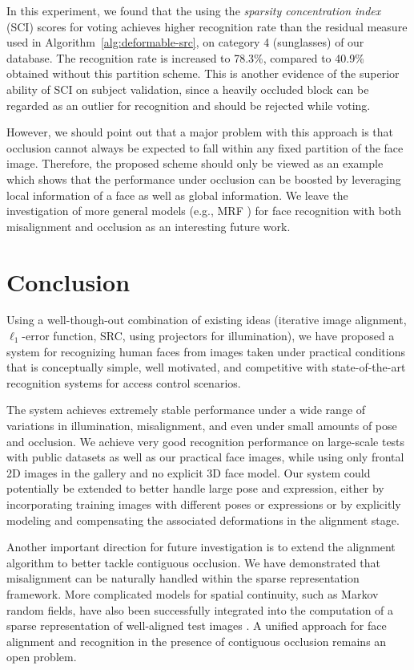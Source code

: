 \documentclass[10pt,journal,letterpaper,compsoc]{IEEEtran} %
\begin{document}
In this experiment, we found that the using the \emph{sparsity
concentration index} (SCI) scores for voting achieves higher
recognition rate than the residual measure used in Algorithm~\ref{alg:deformable-src}, on
category 4 (sunglasses) of our database. The recognition rate
is increased to 78.3\%, compared to 40.9\% obtained without
this partition scheme. This is another evidence of the superior
ability of SCI on subject validation, since a heavily occluded
block can be regarded as an outlier for recognition and should
be rejected while voting.

However, we should point out that a major problem with this
approach is that occlusion cannot always be expected to fall within
 any fixed partition of the face image. Therefore, the
proposed scheme should only be viewed as an example which shows
that the performance under occlusion can be boosted by
leveraging local information of a face as well as global information. We
leave the investigation of more general models (e.g., MRF \cite{ZhouZ2009}) for face
recognition with both misalignment and occlusion as an
interesting future work.

\section{Conclusion}\label{sec:conclusion}
Using a well-though-out combination of existing ideas
(iterative image alignment, $\ell_1$-error function, SRC, using projectors for
illumination), we have proposed a system for recognizing human faces
from images taken under practical conditions that is conceptually simple, well
motivated, and competitive with state-of-the-art recognition systems for access
control scenarios.

The system achieves extremely stable performance under
a wide range of variations in illumination, misalignment, and even under small amounts of
pose and occlusion. We achieve very good recognition performance on
large-scale tests with public datasets as well as our practical face
images, while using only frontal 2D images in the gallery and no
explicit 3D face model.
Our system could potentially be extended to better handle large pose
and expression, either by incorporating training images with different poses or
expressions or by explicitly modeling and compensating the associated deformations
in the alignment stage.

Another important direction for future
investigation is to extend the alignment algorithm to better
tackle contiguous occlusion. We have demonstrated that misalignment can be naturally handled within the
sparse representation framework. More complicated models for
spatial continuity, such as Markov random fields, have also
been successfully integrated into the computation of a sparse
representation of well-aligned test images
\cite{Cevher2008-NIPS, ZhouZ2009}. A unified approach
for face alignment and recognition in the presence of
contiguous occlusion remains an open problem.
\end{document}
